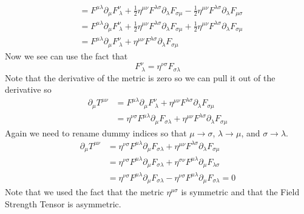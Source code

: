 \documentclass[11pt]{article}
\numberwithin{equation}{section}
\begin{document}
\begin{enumerate}[(a)]
\begin{align*}
&= F^{\mu\lambda}\partial_{\mu}F^{\nu}_{\ \lambda} + \frac{1}{2}\eta^{\mu\nu}F^{\lambda\sigma}\partial_{\lambda}F_{\sigma\mu} - \frac{1}{2}\eta^{\mu\nu}F^{\lambda\sigma}\partial_{\lambda}F_{\mu\sigma}\\
&= F^{\mu\lambda}\partial_{\mu}F^{\nu}_{\ \lambda} + \frac{1}{2}\eta^{\mu\nu}F^{\lambda\sigma}\partial_{\lambda}F_{\sigma\mu} + \frac{1}{2}\eta^{\mu\nu}F^{\lambda\sigma}\partial_{\lambda}F_{\sigma\mu}\\
&= F^{\mu\lambda}\partial_{\mu}F^{\nu}_{\ \lambda} + \eta^{\mu\nu}F^{\lambda\sigma}\partial_{\lambda}F_{\sigma\mu} 
\end{align*}
Now we see can use the fact that
$$F^{\nu}_{\ \lambda} = \eta^{\nu\sigma}F_{\sigma\lambda}$$
Note that the derivative of the metric is zero so we can pull it out of the derivative so
\begin{align*}
\partial_{\mu}T^{\mu\nu} &= F^{\mu\lambda}\partial_{\mu}F^{\nu}_{\ \lambda} + \eta^{\mu\nu}F^{\lambda\sigma}\partial_{\lambda}F_{\sigma\mu} \\
&= \eta^{\nu\sigma}F^{\mu\lambda}\partial_{\mu}F_{\sigma\lambda} + \eta^{\mu\nu}F^{\lambda\sigma}\partial_{\lambda}F_{\sigma\mu} 
\end{align*}
Again we need to rename dummy indices so that $\mu\rightarrow\sigma$, $\lambda\rightarrow\mu$, and $\sigma\rightarrow\lambda$.
\begin{align*}
\partial_{\mu}T^{\mu\nu} &= \eta^{\nu\sigma}F^{\mu\lambda}\partial_{\mu}F_{\sigma\lambda} + \eta^{\mu\nu}F^{\lambda\sigma}\partial_{\lambda}F_{\sigma\mu} \\
&= \eta^{\nu\sigma}F^{\mu\lambda}\partial_{\mu}F_{\sigma\lambda} + \eta^{\sigma\nu}F^{\mu\lambda}\partial_{\mu}F_{\lambda\sigma} \\
&= \eta^{\nu\sigma}F^{\mu\lambda}\partial_{\mu}F_{\sigma\lambda} - \eta^{\nu\sigma}F^{\mu\lambda}\partial_{\mu}F_{\sigma\lambda} = 0
\end{align*}
Note that we used the fact that the metric $\eta^{\mu\sigma}$ is symmetric and that the Field Strength Tensor is asymmetric.


\end{enumerate}
\end{document}
